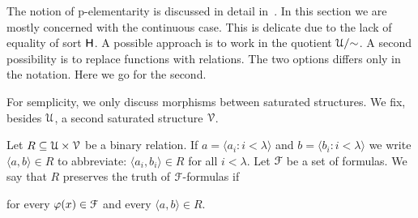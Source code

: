 \documentclass{amsproc}
\begin{document}
{\begin{comment}
\begin{fact}\label{fact_pel_invertible}
  Let ${\EuScript F}$ be a p-dense set of positive formulas. 
  If $f$ preserve the truth of formulas in ${\EuScript F}$, then $\varphi(a)\leftrightarrow\varphi(fa)$ for every $\varphi(x)\in{\EuScript F}^{\rm p}$ and every $a\in({\rm dom }f)^{|x|}$.
\end{fact}

\begin{proof}
  Assume $\neg\varphi(a)$ and apply Proposition~\ref{prop_Fapprox} to infer that  $\psi(fa)$ holds for some $\psi(x)\in{\EuScript F}^{\rm p}$ that implies $\neg\varphi(x)$.
\end{proof}

If $f$ is p-elementary, ${\rm dom}f\subseteq M$, and ${\rm range}f\subseteq N$ then we say that $f:M\rightarrow N$ is p-elementary.
This terminology is convenient but imprecise.
More correctly, in~\cite{clcl} such maps are called \textit{approximate\/} p-elementary.
In fact, from the elementarity of $f:{\EuScript U}\rightarrow{\EuScript U}$ we can (only) infer that

\ceq{\hfill M\models\{\varphi(a)\}'}{\Leftrightarrow}{N\models\{\varphi(fa)\}'.}

As below we always evaluate formulas in ${\EuScript U}$, we can safely drop the modifier \textit{approximate}.
  
\end{comment}

The notion of p-elementarity is discussed in detail in~\cite{clcl}.
In this section we are mostly concerned with the continuous case.
This is delicate due to the lack of equality of sort ${\sf H}$.
A possible approach is to work in the quotient ${\EuScript U}/{\sim}$.
A second possibility is to replace functions with relations.
The two options differs only in the notation.
Here we go for the second.

For semplicity, we only discuss morphisms between saturated structures.
We fix, besides ${\EuScript U}$, a second saturated structure ${\EuScript V}$.

Let $R\mathrel{\subseteq}{\EuScript U}\times{\EuScript V}$ be a binary relation.
If $a=\langle a_i:i<\lambda\rangle$ and $b=\langle b_i:i<\lambda\rangle$ we write $\langle a,b\rangle\in R$ to abbreviate: $\langle a_i,b_i\rangle\in R$ for all $i<\lambda$.
Let ${\EuScript F}$ be a set of formulas.
We say that $R$ preserves the truth of ${\EuScript F}$-formulas if 

\hfill for every $\varphi(x)\in{\EuScript F}$ and every $\langle a,b\rangle\in R$.

}
\end{document}
